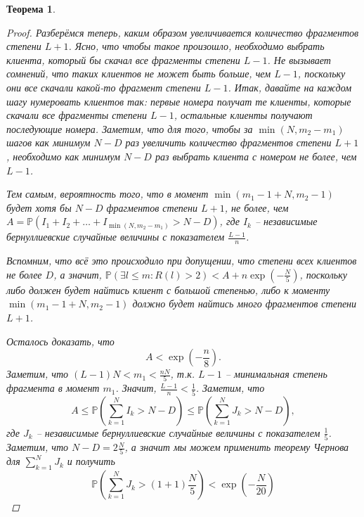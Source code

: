 \documentclass[10pt]{article}
\newcommand{\PRob}{\mathbb P}
\newcommand{\leqs}{\leqslant}
\newtheorem{theorem}{Теорема}
\theoremstyle{named}
\begin{document}
\begin{theorem}
\begin{proof}
Разберёмся теперь, каким образом увеличивается количество фрагментов степени $L+1$. 
Ясно, что чтобы такое произошло, необходимо выбрать клиента, который бы скачал все фрагменты степени $L-1$. 
Не вызывает сомнений, что таких клиентов не может быть больше, чем $L-1$, поскольку они все скачали какой-то фрагмент степени $L-1$.
Итак, давайте на каждом шагу нумеровать клиентов так: первые номера получат те клиенты, 
которые скачали все фрагменты степени $L-1$, остальные клиенты получают последующие номера. 
Заметим, что для того, чтобы за $\min(N, m_2 - m_1)$ шагов как минимум $N-D$ раз увеличить количество фрагментов степени $L+1$,
необходимо как минимум $N-D$ раз выбрать клиента с номером не более, чем $L-1$.

Тем самым, вероятность того, что в момент $\min(m_1 - 1 + N, m_2 - 1)$ будет хотя бы $N-D$ фрагментов степени $L+1$, 
не более, чем $ A = \PRob(I_1 + I_2 + \dots + I_{\min(N, m_2 - m_1)} > N - D)$, 
где $I_k$ -- независимые бернуллиевские случайные величины с показателем $\frac{L-1}{n}$.

Вспомним, что всё это происходило при допущении, что степени всех клиентов не более $D$, 
а значит, $\PRob\left(\exists l \leqs m : R(l) > 2 \right) < A +  n\exp\left(-\frac{N}{5}\right)$, 
поскольку либо должен будет найтись клиент с большой степенью, 
либо к моменту $\min(m_1 - 1 + N, m_2 - 1)$ должно будет найтись много фрагментов степени $L+1$.

Осталось доказать, что 
\begin{equation}
A < \exp\left(- \frac{n}{8}\right).
\end{equation}
Заметим, что $(L-1) N < m_1 < \frac{nN}{5}$, т.к. $L-1$ -- минимальная степень фрагмента в момент $m_1$.
Значит, $\frac{L-1}{n} < \frac{1}{5}$. Заметим, что
\begin{equation}
A \leqs \PRob\left(\sum_{k = 1}^N I_k > N - D\right) \leqs \PRob\left(\sum_{k = 1}^N J_k > N - D\right),
\end{equation}
где $J_k$ -- независимые бернуллиевские случайные величины с показателем $\frac{1}{5}$. 
Заметим, что $N - D = 2 \frac{N}{5}$, а значит мы можем применить 
теорему Чернова для $\sum\limits_{k = 1}^N J_k$ и получить
\begin{equation}
\PRob\left(\sum_{k = 1}^N J_k > (1 + 1) \frac{N}{5}\right) < \exp\left( - \frac{N}{20}\right)
\end{equation}

\end{proof}

\end{theorem}
\end{document}
